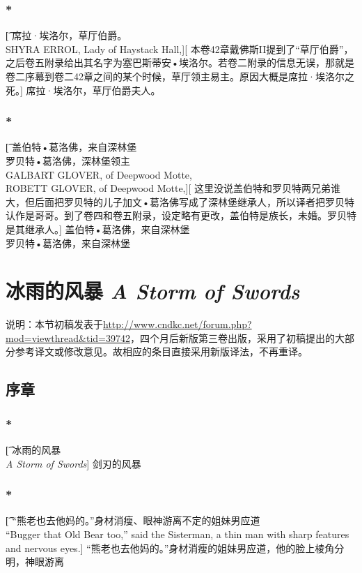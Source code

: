 \documentclass[12pt,a4paper]{article}
\begin{document}
\subsubsection{\color{red}*}\t[
	{\large 席拉·埃洛尔}，草厅伯爵。\\
	SHYRA ERROL, Lady of Haystack Hall,][
	本卷42章戴佛斯II提到了“草厅伯爵”，之后卷五附录给出其名字为塞巴斯蒂安•埃洛尔。若卷二附录的信息无误，那就是卷二序幕到卷二42章之间的某个时候，草厅领主易主。原因大概是席拉·埃洛尔之死。]
	{\large 席拉·埃洛尔}，草厅伯爵夫人。
	
\subsubsection{\color{red}*}\t[
	{\large 盖伯特•葛洛佛}，来自深林堡\\
	{\large 罗贝特•葛洛佛}，深林堡领主\\
	GALBART GLOVER, of Deepwood Motte,\\
	ROBETT GLOVER, of Deepwood Motte,][
	这里没说盖伯特和罗贝特两兄弟谁大，但后面把罗贝特的儿子加文•葛洛佛写成了深林堡继承人，所以译者把罗贝特认作是哥哥。到了卷四和卷五附录，设定略有更改，盖伯特是族长，未婚。罗贝特是其继承人。]
	{\large 盖伯特•葛洛佛}，来自深林堡\\
	{\large 罗贝特•葛洛佛}，来自深林堡
	

	
\newpage
\section{冰雨的风暴 \emph{A Storm of Swords}}
\setcounter{subsection}{-1}



说明：本节初稿发表于\url{http://www.cndkc.net/forum.php?mod=viewthread&tid=39742}，四个月后新版第三卷出版，采用了初稿提出的大部分参考译文或修改意见。故相应的条目直接采用新版译法，不再重译。

\subsection{序章}

\subsubsection{\color{red}*}\t[
冰雨的风暴\\
\emph{A Storm of Swords}]
剑刃的风暴

\subsubsection{\color{red}*}\t[
	“熊老也去他妈的。”身材消瘦、眼神游离不定的姐妹男应道\\
	“Bugger that Old Bear too,” said the Sisterman, a thin man with sharp features and nervous eyes.]
	“熊老也去他妈的。”身材消瘦的姐妹男应道，他的脸上棱角分明，神眼游离
\end{document}

